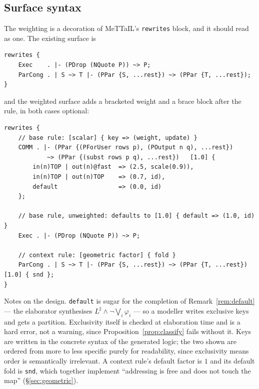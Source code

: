 \documentclass[11pt,a4paper]{article}
\theoremstyle{plain}
\theoremstyle{definition}
\theoremstyle{remark}
\begin{document}
\subsection{Surface syntax}

The weighting is a decoration of MeTTaIL's \texttt{rewrites} block, and it should read as one. The
existing surface is
\begin{center}
\begin{minipage}{0.88\textwidth}
\begin{lstlisting}
rewrites {
    Exec    . |- (PDrop (NQuote P)) ~> P;
    ParCong . | S ~> T |- (PPar {S, ...rest}) ~> (PPar {T, ...rest});
}
\end{lstlisting}
\end{minipage}
\end{center}
and the weighted surface adds a bracketed weight and a brace block after the rule, in both cases
optional:
\begin{center}
\begin{minipage}{0.88\textwidth}
\begin{lstlisting}
rewrites {
    // base rule: [scalar] { key => (weight, update) }
    COMM . |- (PPar {(PForUser rows p), (POutput n q), ...rest})
            ~> (PPar {(subst rows p q), ...rest})   [1.0] {
        in(n)TOP | out(n)@fast  => (2.5, scale(0.9)),
        in(n)TOP | out(n)TOP    => (0.7, id),
        default                 => (0.0, id)
    };

    // base rule, unweighted: defaults to [1.0] { default => (1.0, id) }
    Exec . |- (PDrop (NQuote P)) ~> P;

    // context rule: [geometric factor] { fold }
    ParCong . | S ~> T |- (PPar {S, ...rest}) ~> (PPar {T, ...rest})  [1.0] { snd };
}
\end{lstlisting}
\end{minipage}
\end{center}

Notes on the design. \texttt{default} is sugar for the completion of
Remark~\ref{rem:default} --- the elaborator synthesises
$L^\sharp \wedge \neg\bigvee_i \varphi_i$ --- so a modeller writes exclusive keys and gets a
partition. Exclusivity itself is checked at elaboration time and is a hard error, not a warning,
since Proposition~\ref{prop:classify} fails without it. Keys are written in the concrete syntax of
the generated logic; the two shown are ordered from more to less specific purely for readability,
since exclusivity means order is semantically irrelevant. A context rule's default factor is
$1$ and its default fold is \texttt{snd}, which together implement ``addressing is free and does not
touch the map'' (\S\ref{sec:geometric}).
\end{document}
